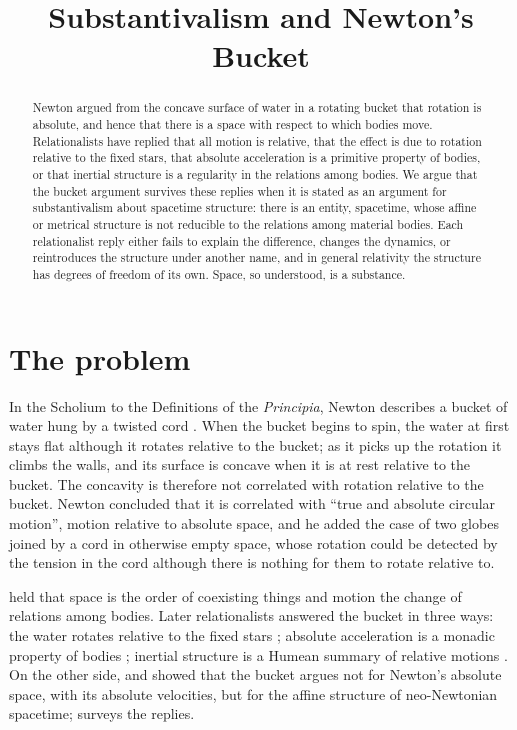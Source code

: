\documentclass{situationist-preprint}
\title{Substantivalism and Newton's Bucket}
\begin{document}
\maketitle

\begin{abstract}
Newton argued from the concave surface of water in a rotating bucket that rotation is absolute, and hence that there is a space with respect to which bodies move. Relationalists have replied that all motion is relative, that the effect is due to rotation relative to the fixed stars, that absolute acceleration is a primitive property of bodies, or that inertial structure is a regularity in the relations among bodies. We argue that the bucket argument survives these replies when it is stated as an argument for substantivalism about spacetime structure: there is an entity, spacetime, whose affine or metrical structure is not reducible to the relations among material bodies. Each relationalist reply either fails to explain the difference, changes the dynamics, or reintroduces the structure under another name, and in general relativity the structure has degrees of freedom of its own. Space, so understood, is a substance.
\end{abstract}

\section{The problem}

In the Scholium to the Definitions of the \emph{Principia}, Newton describes a bucket of water hung by a twisted cord \citep{Newton1687}. When the bucket begins to spin, the water at first stays flat although it rotates relative to the bucket; as it picks up the rotation it climbs the walls, and its surface is concave when it is at rest relative to the bucket. The concavity is therefore not correlated with rotation relative to the bucket. Newton concluded that it is correlated with \enquote{true and absolute circular motion}, motion relative to absolute space, and he added the case of two globes joined by a cord in otherwise empty space, whose rotation could be detected by the tension in the cord although there is nothing for them to rotate relative to.

\citet{Leibniz1716} held that space is the order of coexisting things and motion the change of relations among bodies. Later relationalists answered the bucket in three ways: the water rotates relative to the fixed stars \citep{Mach1883}; absolute acceleration is a monadic property of bodies \citep{Sklar1974}; inertial structure is a Humean summary of relative motions \citep{Huggett2006}. On the other side, \citet{Stein1967} and \citet{Earman1989} showed that the bucket argues not for Newton's absolute space, with its absolute velocities, but for the affine structure of neo-Newtonian spacetime; \citet{Pooley2013} surveys the replies.
\end{document}
